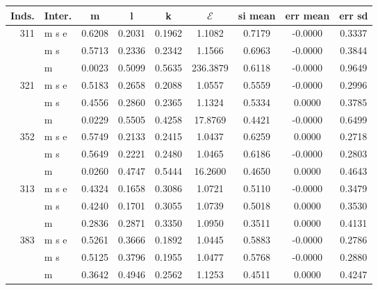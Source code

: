 \documentclass{standalone}
\begin{document}
\begin{tabular}{rlccccccc} \toprule
Inds.& Inter.& m  & l  & k  & $\mathcal{E}$  & si mean  & err mean  & err sd  \\  \hline
311& m s e &    0.6208 &    0.2031 &    0.1962 &    1.1082 &    0.7179 &   -0.0000 &    0.3337 \\  
& m s &    0.5713 &    0.2336 &    0.2342 &    1.1566 &    0.6963 &   -0.0000 &    0.3844 \\  
& m &    0.0023 &    0.5099 &    0.5635 &  236.3879 &    0.6118 &   -0.0000 &    0.9649 \\  \hline
321& m s e &    0.5183 &    0.2658 &    0.2088 &    1.0557 &    0.5559 &   -0.0000 &    0.2996 \\  
& m s &    0.4556 &    0.2860 &    0.2365 &    1.1324 &    0.5334 &    0.0000 &    0.3785 \\  
& m &    0.0229 &    0.5505 &    0.4258 &   17.8769 &    0.4421 &   -0.0000 &    0.6499 \\ \hline
352& m s e &    0.5749 &    0.2133 &    0.2415 &    1.0437 &    0.6259 &    0.0000 &    0.2718 \\  
& m s &    0.5649 &    0.2221 &    0.2480 &    1.0465 &    0.6186 &   -0.0000 &    0.2803 \\  
& m &    0.0260 &    0.4747 &    0.5444 &   16.2600 &    0.4650 &    0.0000 &    0.4643 \\ \hline
313& m s e &    0.4324 &    0.1658 &    0.3086 &    1.0721 &    0.5110 &   -0.0000 &    0.3479 \\  
& m s &    0.4240 &    0.1701 &    0.3055 &    1.0739 &    0.5018 &    0.0000 &    0.3530 \\  
& m &    0.2836 &    0.2871 &    0.3350 &    1.0950 &    0.3511 &    0.0000 &    0.4131 \\ \hline
383& m s e &    0.5261 &    0.3666 &    0.1892 &    1.0445 &    0.5883 &   -0.0000 &    0.2786 \\  
& m s &    0.5125 &    0.3796 &    0.1955 &    1.0477 &    0.5768 &   -0.0000 &    0.2880 \\  
& m &    0.3642 &    0.4946 &    0.2562 &    1.1253 &    0.4511 &    0.0000 &    0.4247 \\ 
\bottomrule \end{tabular}
\end{document}

